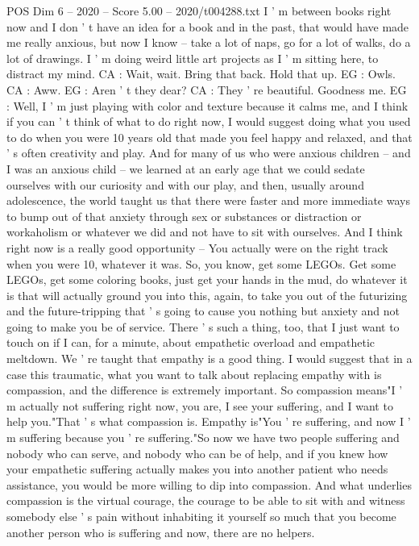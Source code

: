 \begin{textsample}{POS Dim 6 – 2020 – Score 5.00 – 2020/t004288.txt}
I ' m between books right now and I don ' t have an idea for a book and in the past, that would have made me really anxious, but now I know -- take a lot of naps, go for a lot of walks, do a lot of drawings.
I ' m doing weird little art projects as I ' m sitting here, to distract my mind.
CA : Wait, wait.
Bring that back.
Hold that up.
EG : Owls.
CA : Aww.
EG : Aren ' t they dear?
CA : They ' re beautiful.
Goodness me.
EG : Well, I ' m just playing with color and texture because it calms me, and I think if you can ' t think of what to do right now, I would suggest doing what you used to do when you were 10 years old that made you feel happy and relaxed, and that ' s often creativity and play.
And for many of us who were anxious children -- and I was an anxious child -- we learned at an early age that we could sedate ourselves with our curiosity and with our play, and then, usually around adolescence, the world taught us that there were faster and more immediate ways to bump out of that anxiety through sex or substances or distraction or workaholism or whatever we did and not have to sit with ourselves.
And I think right now is a really good opportunity -- You actually were on the right track when you were 10, whatever it was.
So, you know, get some LEGOs.
Get some LEGOs, get some coloring books, just get your hands in the mud, do whatever it is that will actually ground you into this, again, to take you out of the futurizing and the future-tripping that ' s going to cause you nothing but anxiety and not going to make you be of service.
There ' s such a thing, too, that I just want to touch on if I can, for a minute, about empathetic overload and empathetic meltdown.
We ' re taught that empathy is a good thing.
I would suggest that in a case this traumatic, what you want to talk about replacing empathy with is compassion, and the difference is extremely important.
So compassion means"I ' m actually not suffering right now, you are, I see your suffering, and I want to help you."That ' s what compassion is.
Empathy is"You ' re suffering, and now I ' m suffering because you ' re suffering."So now we have two people suffering and nobody who can serve, and nobody who can be of help, and if you knew how your empathetic suffering actually makes you into another patient who needs assistance, you would be more willing to dip into compassion.
And what underlies compassion is the virtual courage, the courage to be able to sit with and witness somebody else ' s pain without inhabiting it yourself so much that you become another person who is suffering and now, there are no helpers.

\end{textsample}
